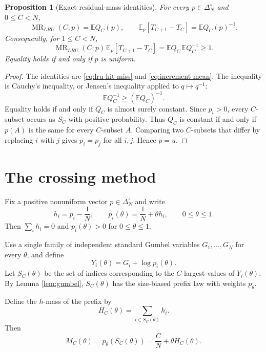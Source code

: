 \documentclass[11pt]{article}
\newtheorem{proposition}[theorem]{Proposition}
\newcommand{\E}{\mathbb E}
\newcommand{\1}{\mathbf 1}
\newcommand{\MR}{\operatorname{MR}}
\begin{document}
\begin{proposition}[Exact residual-mass identities]\label{prop:residual-identities}
For every $p\in\Delta_N^\circ$ and $0\le C<N$,
\begin{equation}\label{eq:residual-identities}
        \MR_{LRU}(C;p)=\E Q_C(p),
        \qquad
        \E_p[T_{C+1}-T_C]=\E Q_C(p)^{-1}.
\end{equation}
Consequently, for $1\le C<N$,
\begin{equation}\label{eq:jensen-product}
        \MR_{LRU}(C;p)\,\E_p[T_{C+1}-T_C]
        =\E Q_C\,\E Q_C^{-1}\ge 1.
\end{equation}
Equality holds if and only if $p$ is uniform.
\end{proposition}

\begin{proof}
The identities are \eqref{eq:lru-hit-miss} and \eqref{eq:increment-mean}.  The inequality
is Cauchy's inequality, or Jensen's inequality applied to $q\mapsto q^{-1}$:
\[
        \E Q_C^{-1}\ge (\E Q_C)^{-1}.
\]
Equality holds if and only if $Q_C$ is almost surely constant.  Since $p_i>0$, every
$C$-subset occurs as $S_C$ with positive probability.  Thus $Q_C$ is constant if and only
if $p(A)$ is the same for every $C$-subset $A$.  Comparing two $C$-subsets that differ by
replacing $i$ with $j$ gives $p_i=p_j$ for all $i,j$.  Hence $p=u$.
\end{proof}

\section{The crossing method}

Fix a positive nonuniform vector $p\in\Delta_N^\circ$ and write
\[
        h_i=p_i-\frac1N,
        \qquad
        p_i(\theta)=\frac1N+\theta h_i,
        \qquad
        0\le\theta\le1.
\]
Then $\sum_i h_i=0$ and $p_i(\theta)>0$ for $0\le\theta\le1$.

Use a single family of independent standard Gumbel variables $G_1,\ldots,G_N$ for every
$\theta$, and define
\begin{equation}\label{eq:Ytheta}
        Y_i(\theta)=G_i+\log p_i(\theta).
\end{equation}
Let $S_C(\theta)$ be the set of indices corresponding to the $C$ largest values of
$Y_i(\theta)$.  By Lemma \ref{lem:gumbel}, $S_C(\theta)$ has the size-biased prefix law
with weights $p_\theta$.

Define the $h$-mass of the prefix by
\begin{equation}\label{eq:H-def}
        H_C(\theta)=\sum_{i\in S_C(\theta)}h_i.
\end{equation}
Then
\begin{equation}\label{eq:M-as-c-plus-theta-H}
        M_C(\theta)=p_\theta(S_C(\theta))
        =\frac CN+\theta H_C(\theta).
\end{equation}
\end{document}
